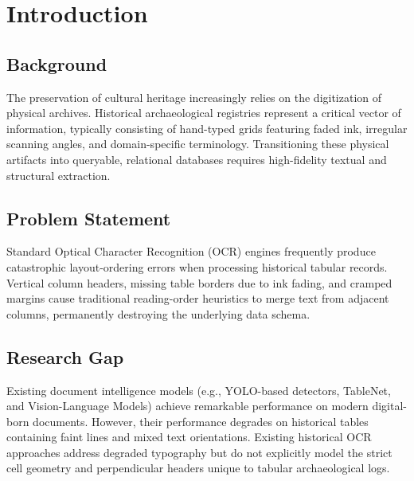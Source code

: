 \documentclass[pdflatex,sn-mathphys-num]{sn-jnl}
\begin{document}

\maketitle


\section{Introduction}
\label{sec:intro}

\subsection{Background}
The preservation of cultural heritage increasingly relies on the digitization of physical archives. Historical archaeological registries represent a critical vector of information, typically consisting of hand-typed grids featuring faded ink, irregular scanning angles, and domain-specific terminology. Transitioning these physical artifacts into queryable, relational databases requires high-fidelity textual and structural extraction.

\subsection{Problem Statement}
Standard Optical Character Recognition (OCR) engines frequently produce catastrophic layout-ordering errors when processing historical tabular records. Vertical column headers, missing table borders due to ink fading, and cramped margins cause traditional reading-order heuristics to merge text from adjacent columns, permanently destroying the underlying data schema.

\subsection{Research Gap}
Existing document intelligence models (e.g., YOLO-based detectors, TableNet, and Vision-Language Models) achieve remarkable performance on modern digital-born documents. However, their performance degrades on historical tables containing faint lines and mixed text orientations. Existing historical OCR approaches address degraded typography but do not explicitly model the strict cell geometry and perpendicular headers unique to tabular archaeological logs. 
\end{document}
